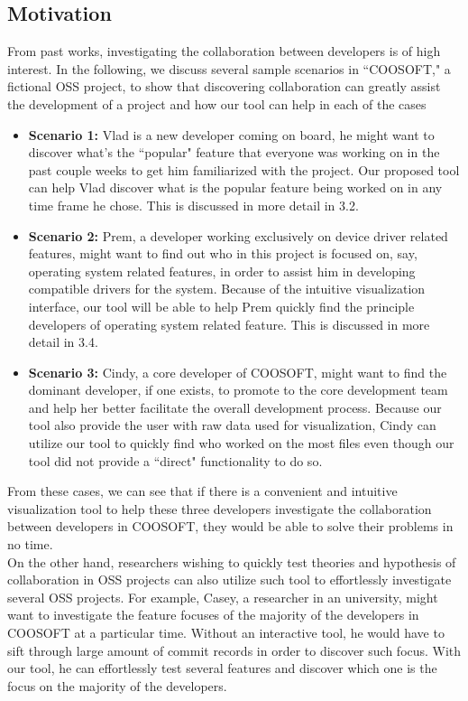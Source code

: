 \documentclass{article}
\begin{document}
\subsection{Motivation}
From past works, investigating the collaboration between developers is of high interest. In the following, we discuss several sample scenarios in ``COOSOFT," a fictional OSS project, to show that discovering collaboration can greatly assist the development of a project and how our tool can help in each of the cases\\
\begin{itemize}
    \item \textbf{Scenario 1:} Vlad is a new developer coming on board, he might want to discover what's the ``popular" feature that everyone was working on in the past couple weeks to get him familiarized with the project. Our proposed tool can help Vlad discover what is the popular feature being worked on in any time frame he chose. This is discussed in more detail in 3.2.
    \item \textbf{Scenario 2:} Prem, a developer working exclusively on device driver related features, might want to find out who in this project is focused on, say, operating system related features, in order to assist him in developing compatible drivers for the system. Because of the intuitive visualization interface, our tool will be able to help Prem quickly find the principle developers of operating system related feature. This is discussed in more detail in 3.4. 
    \item \textbf{Scenario 3:} Cindy, a core developer of COOSOFT, might want to find the dominant developer, if one exists, to promote to the core development team and help her better facilitate the overall development process. Because our tool also provide the user with raw data used for visualization, Cindy can utilize our tool to quickly find who worked on the most files even though our tool did not provide a ``direct" functionality to do so. 
\end{itemize}
From these cases, we can see that if there is a convenient and intuitive visualization tool to help these three developers investigate the collaboration between developers in COOSOFT, they would be able to solve their problems in no time.\\
On the other hand, researchers wishing to quickly test theories and hypothesis of collaboration in OSS projects can also utilize such tool to effortlessly investigate several OSS projects. For example, Casey, a researcher in an university, might want to investigate the feature focuses of the majority of the developers in COOSOFT at a particular time. Without an interactive tool, he would have to sift through large amount of commit records in order to discover such focus. With our tool, he can effortlessly test several features and discover which one is the focus on the majority of the developers.\\
\end{document}
